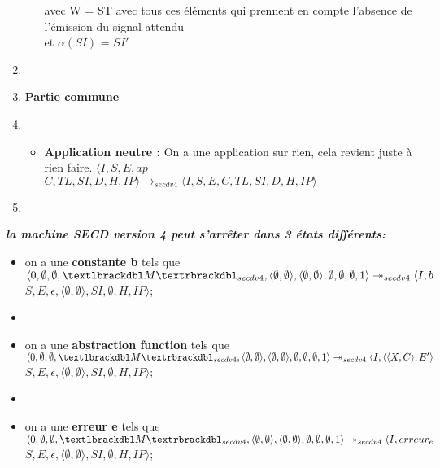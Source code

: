 \documentclass[10pt,a4paper]{article}
\begin{document}
\begin{enumerate}
\begin{itemize}
						avec W = ST avec tous ces éléments qui prennent en compte l'absence de l'émission du signal attendu
						\\et  $\alpha(SI)$ = $SI'$ 
					\end{itemize}
					\item[]
					\item[] \textbf{Partie commune} 
					\item[]
					\begin{itemize}
						\item[] \textbf{Application neutre :} On a une application sur rien, cela revient juste à rien faire.
						\smallbreak 
						$\langle I,S,E,ap$ $C,TL,SI,D,H,IP\rangle
						\longrightarrow_{secdv4} \langle I,S,E,C,TL,SI,D,H,IP\rangle$
					\end{itemize}
					
					\item[]
				\end{enumerate}
				\bigbreak
				\bigbreak
				
				
				\textbf{\textit{la machine SECD version 4 peut s'arrêter dans 3 états différents:}}
				\smallbreak
				\begin{itemize}
					\item[] on a une \textbf{constante b} tels que $\langle 0,\emptyset,\emptyset,\textlbrackdbl M\textrbrackdbl_{secdv4},\langle\emptyset,\emptyset\rangle,\langle\emptyset,\emptyset\rangle,\emptyset,\emptyset,\emptyset,1\rangle \\
					\twoheadrightarrow_{secdv4} \langle I,b$ $S,E,\epsilon,\langle\emptyset,\emptyset\rangle,SI,\emptyset,H,IP\rangle$;
					\item[] 
					\item[] on a une \textbf{abstraction function} tels que
					$\langle 0,\emptyset,\emptyset,\textlbrackdbl M\textrbrackdbl_{secdv4},\langle\emptyset,\emptyset\rangle,\langle\emptyset,\emptyset\rangle,\emptyset,\emptyset,\emptyset,1\rangle \\
					\twoheadrightarrow_{secdv4} \langle I,\langle\langle X,C\rangle,E'\rangle$ $S,E,\epsilon,\langle\emptyset,\emptyset\rangle,SI,\emptyset,H,IP\rangle$;
					\item[] 
					\item[] on a une \textbf{erreur e} tels que 
					$\langle 0,\emptyset,\emptyset,\textlbrackdbl M\textrbrackdbl_{secdv4},\langle\emptyset,\emptyset\rangle,\langle\emptyset,\emptyset\rangle,\emptyset,\emptyset,\emptyset,1\rangle \\
					\twoheadrightarrow_{secdv4} \langle I,erreur_{e}$ $S,E,\epsilon,\langle\emptyset,\emptyset\rangle,SI,\emptyset,H,IP\rangle$;
				\end{itemize}
		\newpage
\end{document}
